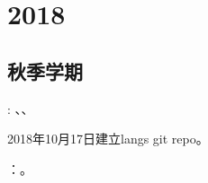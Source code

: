 \section{2018}
\label{sec:g2018}
\subsection{秋季学期}
\label{sec:g2018f}
: \ZY、\ZhangYX、

2018年10月17日建立langs git repo。

：。




